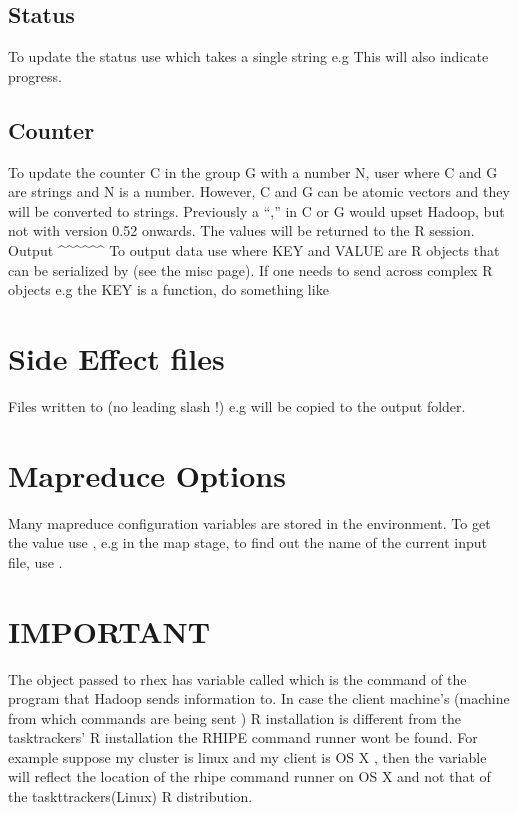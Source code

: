 \documentclass[letterpaper,10pt,english]{sphinxmanual}
\begin{document}
\subsection{Status}
\label{rhmr:status}
To update the status use  which takes a single string e.g 
This will also indicate progress.


\subsection{Counter}
\label{rhmr:counter}
To update the counter C in the group G with a number N, user 
where C and G are strings and N is a number. However, C and G can be atomic vectors and they will be converted to strings.
Previously a ``,'' in C or G would upset Hadoop, but not with version 0.52 onwards.
The values will be returned to the R session.
Output
\textasciicircum{}\textasciicircum{}\textasciicircum{}\textasciicircum{}\textasciicircum{}\textasciicircum{}
To output data use  where KEY and VALUE are R objects that can be serialized by  (see the misc page). If one needs to send across complex R objects e.g the KEY is a function, do something like 


\section{Side Effect files}
\label{rhmr:side-effect-files}
Files written to  (no leading slash !) e.g  will be copied to the output folder.


\section{Mapreduce Options}
\label{rhmr:mapreduce-options}
Many mapreduce configuration variables are stored in the environment. To get the value use , e.g in the map stage, to find out the name of the current input file, use  .


\section{IMPORTANT}
\label{rhmr:important}
The object passed to rhex has variable called  which is the
command of the program that Hadoop sends information to. In case the client
machine's (machine from which commands are being sent ) R installation is different from the
tasktrackers' R installation the RHIPE command runner wont be found. For example
suppose my cluster is linux and my client is OS X , then the 
variable will reflect the location of the rhipe command runner on OS X and not
that of the taskttrackers(Linux) R distribution.
\end{document}
